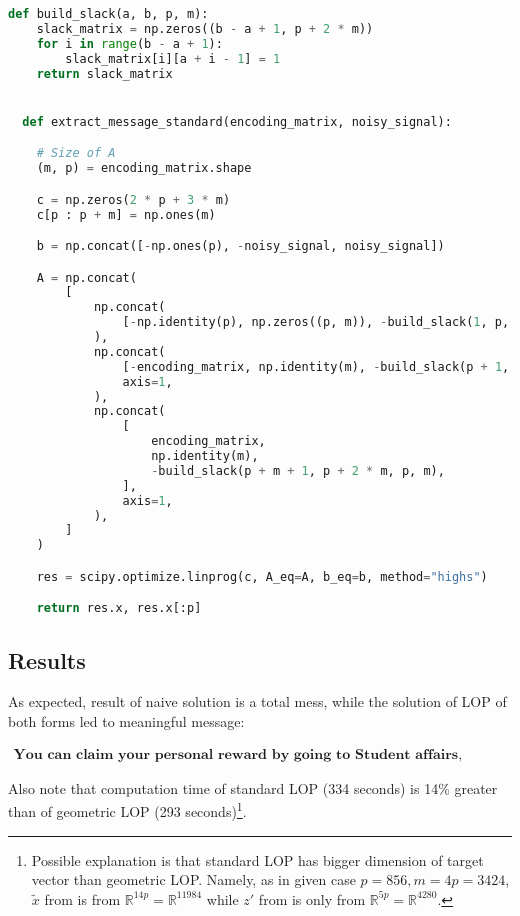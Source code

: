 \documentclass{article}
\def\R{\mathbb{R}}
\def\xt{\tilde{x}}
\begin{document}
\begin{minipage}{\linewidth}
  \begin{lstlisting}[language=Python, caption={Message decryption based on solution of LOP in standard form. The output is tuple of solution of the problem, and decrypted message itself}, label={lst:std}]
  def build_slack(a, b, p, m):
    slack_matrix = np.zeros((b - a + 1, p + 2 * m))
    for i in range(b - a + 1):
        slack_matrix[i][a + i - 1] = 1
    return slack_matrix


  def extract_message_standard(encoding_matrix, noisy_signal):

    # Size of A
    (m, p) = encoding_matrix.shape

    c = np.zeros(2 * p + 3 * m)
    c[p : p + m] = np.ones(m)

    b = np.concat([-np.ones(p), -noisy_signal, noisy_signal])

    A = np.concat(
        [
            np.concat(
                [-np.identity(p), np.zeros((p, m)), -build_slack(1, p, p, m)], axis=1
            ),
            np.concat(
                [-encoding_matrix, np.identity(m), -build_slack(p + 1, p + m, p, m)],
                axis=1,
            ),
            np.concat(
                [
                    encoding_matrix,
                    np.identity(m),
                    -build_slack(p + m + 1, p + 2 * m, p, m),
                ],
                axis=1,
            ),
        ]
    )

    res = scipy.optimize.linprog(c, A_eq=A, b_eq=b, method="highs")

    return res.x, res.x[:p]
\end{lstlisting}
\end{minipage}

\subsection{Results}
As expected, result of naive solution is a total mess, while the solution of LOP of both forms led to meaningful message:

\begin{equation*}
  \begin{aligned}
    \textbf{You can claim your personal reward by going to Student affairs, giving you code=1083 and ask for you reward}
  \end{aligned}
\end{equation*}

Also note that computation time of standard LOP (334 seconds) is 14\% greater than of geometric LOP (293 seconds)\footnote{Possible explanation is that standard LOP has bigger dimension of target vector than geometric LOP. Namely, as in given case $p=856, m=4p=3424$, $\xt$ from  is from $\R^{14p} = \R^{11984}$ while $z'$ from  is only from $\R^{5p} = \R^{4280}$.
}.
\end{document}
